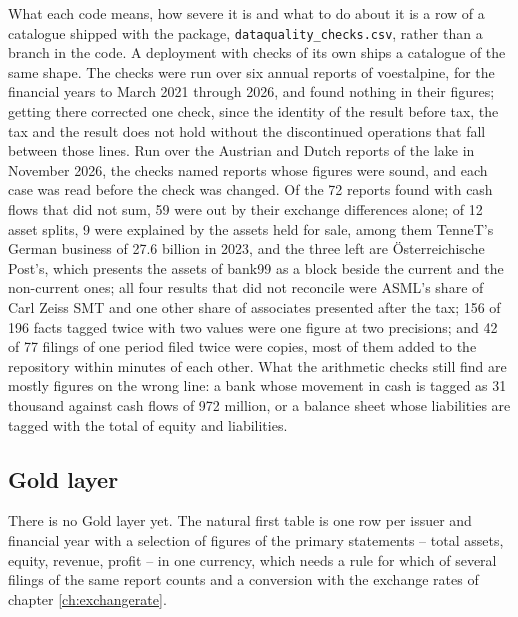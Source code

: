 What each code means, how severe it is and what to do about it is a row of a catalogue shipped with the package, \verb|dataquality_checks.csv|, rather than a branch in the code. A deployment with checks of its own ships a catalogue of the same shape. The checks were run over six annual reports of voestalpine, for the financial years to March 2021 through 2026, and found nothing in their figures; getting there corrected one check, since the identity of the result before tax, the tax and the result does not hold without the discontinued operations that fall between those lines. Run over the Austrian and Dutch reports of the lake in November 2026, the checks named reports whose figures were sound, and each case was read before the check was changed. Of the 72 reports found with cash flows that did not sum, 59 were out by their exchange differences alone; of 12 asset splits, 9 were explained by the assets held for sale, among them TenneT's German business of 27.6 billion in 2023, and the three left are Österreichische Post's, which presents the assets of bank99 as a block beside the current and the non-current ones; all four results that did not reconcile were ASML's share of Carl Zeiss SMT and one other share of associates presented after the tax; 156 of 196 facts tagged twice with two values were one figure at two precisions; and 42 of 77 filings of one period filed twice were copies, most of them added to the repository within minutes of each other. What the arithmetic checks still find are mostly figures on the wrong line: a bank whose movement in cash is tagged as 31 thousand against cash flows of 972 million, or a balance sheet whose liabilities are tagged with the total of equity and liabilities.

\subsection{Gold layer}

There is no Gold layer yet. The natural first table is one row per issuer and financial year with a selection of figures of the primary statements -- total assets, equity, revenue, profit -- in one currency, which needs a rule for which of several filings of the same report counts and a conversion with the exchange rates of chapter \ref{ch:exchangerate}.

